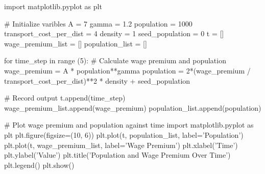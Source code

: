 import matplotlib.pyplot as plt

# Initialize varibles
A     = 7
gamma = 1.2
population = 1000
transport_cost_per_dist = 4
density = 1
seed_population = 0
t = []
wage_premium_list = []
population_list   = []

for time_step in range (5):
    # Calculate wage premium and population
    wage_premium = A * population**gamma
    population = 2*(wage_premium / transport_cost_per_dist)**2 * density + seed_population

    # Record output
    t.append(time_step)
    wage_premium_list.append(wage_premium)
    population_list.append(population)

# Plot wage premium and population against time
import matplotlib.pyplot as plt
plt.figure(figsize=(10, 6))
plt.plot(t, population_list, label='Population')
plt.plot(t, wage_premium_list, label='Wage Premium')
plt.xlabel('Time')
plt.ylabel('Value')
plt.title('Population and Wage Premium Over Time')
plt.legend()
plt.show()